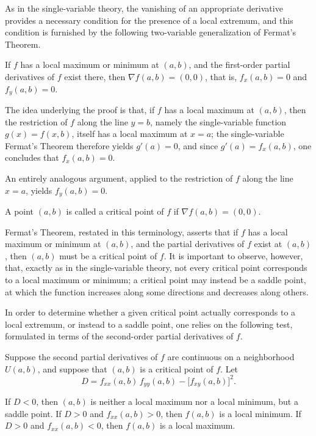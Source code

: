 As in the single-variable theory, the vanishing of an appropriate derivative provides a necessary condition for the presence of a local extremum, and this condition is furnished by the following two-variable generalization of Fermat's Theorem.

\begin{theorem}
If $f$ has a local maximum or minimum at $(a,b)$, and the first-order partial derivatives of $f$ exist there, then $\nabla f(a,b) = (0,0)$, that is, $f_x(a,b) = 0$ and $f_y(a,b) = 0$.

\end{theorem}

The idea underlying the proof is that, if $f$ has a local maximum at $(a,b)$, then the restriction of $f$ along the line $y=b$, namely the single-variable function $g(x) = f(x,b)$, itself has a local maximum at $x=a$; the single-variable Fermat's Theorem therefore yields $g'(a) = 0$, and since $g'(a) = f_x(a,b)$, one concludes that $f_x(a,b) = 0$.

An entirely analogous argument, applied to the restriction of $f$ along the line $x=a$, yields $f_y(a,b) = 0$.

\begin{definition}
A point $(a,b)$ is called a critical point of $f$ if $\nabla f(a,b) = (0,0)$.
\end{definition}

Fermat's Theorem, restated in this terminology, asserts that if $f$ has a local maximum or minimum at $(a,b)$, and the partial derivatives of $f$ exist at $(a,b)$, then $(a,b)$ must be a critical point of $f$. It is important to observe, however, that, exactly as in the single-variable theory, not every critical point corresponds to a local maximum or minimum; a critical point may instead be a saddle point, at which the function increases along some directions and decreases along others.

In order to determine whether a given critical point actually corresponds to a local extremum, or instead to a saddle point, one relies on the following test, formulated in terms of the second-order partial derivatives of $f$.

\begin{theorem}
Suppose the second partial derivatives of $f$ are continuous on a neighborhood $U(a,b)$, and suppose that $(a,b)$ is a critical point of $f$. Let
\[
D = f_{xx}(a,b) \, f_{yy}(a,b) - \big[ f_{xy}(a,b) \big]^2.
\]

If $D < 0$, then $(a,b)$ is neither a local maximum nor a local minimum, but a saddle point. If $D > 0$ and $f_{xx}(a,b) > 0$, then $f(a,b)$ is a local minimum. If $D > 0$ and $f_{xx}(a,b) < 0$, then $f(a,b)$ is a local maximum.
\end{theorem}

